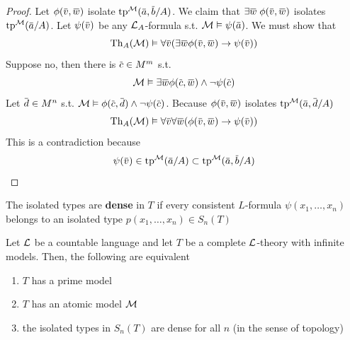 \documentclass[11pt]{article}
\begin{document}
\begin{proof}
Let \(\phi(\barv,\barw)\) isolate \(\tp^{\calm}(\bara,\barb/A)\). We claim
that \(\exists\barw\;\phi(\barv,\barw)\) isolates \(\tp^{\calm}(\bara/A)\). Let \(\psi(\barv)\) be
any \(\mathcal{L}_A\)-formula s.t. \(\calm\vDash\psi(\bara)\). We must show that
\begin{equation*}
\Th_A(\calm)\vDash\forall\barv(\exists\barw\phi(\barv,\barw)\to\psi(\barv))
\end{equation*}
Suppose no, then there is \(\barc\in M^m\) s.t.
\begin{equation*}
\calm\vDash\exists\barw\phi(\barc,\barw)\wedge\neg\psi(\barc)
\end{equation*}
Let \(\bard\in M^n\) s.t. \(\calm\vDash\phi(\barc,\bard)\wedge\neg\psi(\barc)\). Because \(\phi(\barv,\barw)\)
isolates \(\tp^{\calm}(\bara,\bard/A)\)
\begin{equation*}
\Th_A(\calm)\vDash\forall\barv\forall\barw(\phi(\barv,\barw)\to\psi(\barv))
\end{equation*}
This is a contradiction because
\begin{equation*}
\psi(\barv)\in\tp^{\calm}(\bara/A)\subset\tp^{\calm}(\bara,\barb/A)
\end{equation*}
\end{proof}

\begin{definition}[]
The isolated types are \textbf{dense} in \(T\) if every consistent \(L\)-formula \(\psi(x_1,\dots,x_n)\) belongs
to an isolated type \(p(x_1,\dots,x_n)\in S_n(T)\)
\end{definition}


\begin{theorem}[]
\label{thm4.2.10}
Let \(\mathcal{L}\) be a countable language and let \(T\) be a complete \(\mathcal{L}\)-theory with infinite models.
Then, the following are equivalent
\begin{enumerate}
\item \(T\) has a prime model
\item \(T\) has an atomic model \(\mathcal{M}\)
\item the isolated types in \(S_n(T)\) are dense for all \(n\) (in the sense of topology)
\end{enumerate}
\end{theorem}
\end{document}
